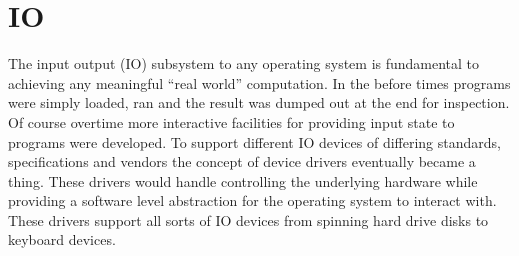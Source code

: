 \documentclass[letterpaper,10pt,draftclsnofoot,onecolumn]{IEEEtran}
\begin{document}
\section{IO}
The input output (IO) subsystem to any operating system is fundamental to achieving any meaningful “real world” computation. In the before times programs were simply loaded, ran and the result was dumped out at the end for inspection. Of course overtime more interactive facilities for providing input state to programs were developed. To support different IO devices of differing standards, specifications and vendors the concept of device drivers eventually became a thing. These drivers would handle controlling the underlying hardware while providing a software level abstraction for the operating system to interact with. These drivers support all sorts of IO devices from spinning hard drive disks to keyboard devices.\\
\end{document}
